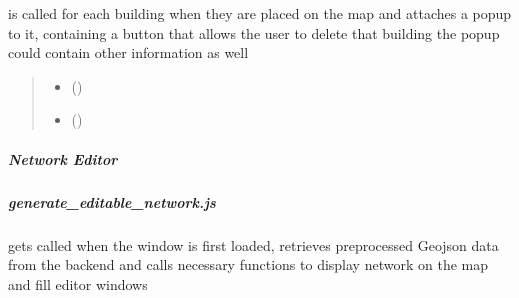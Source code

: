 \documentclass[letterpaper,10pt,english]{sphinxmanual}
\begin{document}
\begin{fulllineitems}
\label{\detokenize{docs_gui/js_api/postcode_editor/display_postcode:createBuildingPopup}}
\pysigstartsignatures
{}
\pysigstopsignatures
\sphinxAtStartPar
is called for each building when they are placed on the map and attaches a popup to it, containing a button that allows the user to delete that building
the popup could contain other information as well
\begin{quote}\begin{description}
\begin{itemize}
\item {} 
\sphinxAtStartPar
{} () \textendash{} 

\item {} 
\sphinxAtStartPar
{} () \textendash{} 

\end{itemize}

\end{description}\end{quote}

\end{fulllineitems}


\sphinxstepscope


\subparagraph{Network Editor}
\label{\detokenize{docs_gui/js_api/network_editor/index:network-editor}}\label{\detokenize{docs_gui/js_api/network_editor/index::doc}}
\sphinxstepscope


\subparagraph{generate\_editable\_network.js}
\label{\detokenize{docs_gui/js_api/network_editor/generate_editable_network:generate-editable-network-js}}\label{\detokenize{docs_gui/js_api/network_editor/generate_editable_network::doc}}

\begin{fulllineitems}
\label{\detokenize{docs_gui/js_api/network_editor/generate_editable_network:GetPandapowerAndWriteGeoJSONNet}}
\pysigstartsignatures
{}
\pysigstopsignatures
\sphinxAtStartPar
gets called when the window is first loaded, retrieves preprocessed Geojson data from the backend
and calls necessary functions to display network on the map and fill editor windows

\end{fulllineitems}
\end{document}
